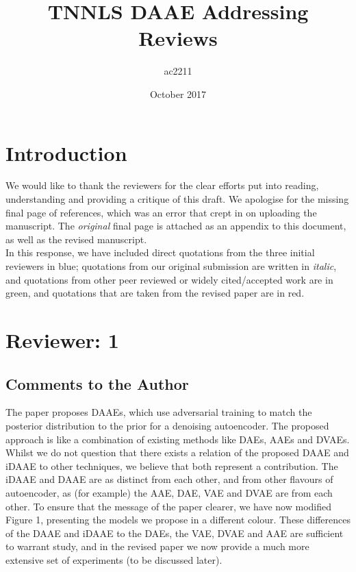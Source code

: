 \documentclass[a4paper,11pt]{article}
\title{TNNLS DAAE Addressing Reviews}
\author{ac2211 }
\date{October 2017}
\begin{document}
\maketitle
\section*{Introduction}
We would like to thank the reviewers for the clear efforts put into reading, understanding and providing a critique of this draft. We apologise for the missing final page of references, which was an error that crept in on uploading the manuscript.  The {\em original} final page is attached as an appendix to this document, as well as the revised manuscript. \\

In this response, we have included direct quotations from the three initial reviewers in {\color{blue}blue}; quotations from our original submission are written in {\em italic}, and quotations from other peer reviewed or widely cited/accepted work are in {\color{green}green}, and quotations that are taken from the revised paper are in {\color{red}red}.

\section*{Reviewer: 1}
\subsection*{Comments to the Author}
{\color{blue} The paper proposes DAAEs, which use adversarial training to match the posterior distribution to the prior for a denoising autoencoder. The proposed approach is like a combination of existing methods like DAEs, AAEs and DVAEs.}\\

Whilst we do not question that there exists a relation of the proposed DAAE and iDAAE to other techniques, we believe that both represent a contribution. The iDAAE and DAAE are as distinct from each other, and from other flavours of autoencoder, as (for example) the AAE, DAE, VAE and DVAE are from each other.  To ensure that the message of the paper clearer, we have now modified Figure 1, presenting the models we propose in a different colour.  These differences of the DAAE and iDAAE to the DAEs, the VAE, DVAE and AAE are sufficient to warrant study, and in the revised paper we now provide a much more extensive set of experiments (to be discussed later).\\
\end{document}
